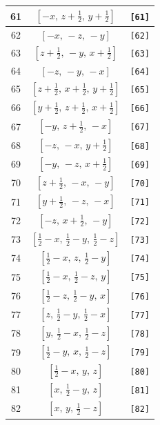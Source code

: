 \documentclass[fleqn,8pt]{jsarticle}
\begin{document}
\begin{longtable}{ccc}
61 & $\left[ - x,\, z + \frac{1}{2},\, y + \frac{1}{2} \right]$ & {\tt [61]} \\ \hline
62 & $\left[ - x,\, - z,\, - y \right]$ & {\tt [62]} \\ \hline
63 & $\left[ z + \frac{1}{2},\, - y,\, x + \frac{1}{2} \right]$ & {\tt [63]} \\ \hline
64 & $\left[ - z,\, - y,\, - x \right]$ & {\tt [64]} \\ \hline
65 & $\left[ z + \frac{1}{2},\, x + \frac{1}{2},\, y + \frac{1}{2} \right]$ & {\tt [65]} \\ \hline
66 & $\left[ y + \frac{1}{2},\, z + \frac{1}{2},\, x + \frac{1}{2} \right]$ & {\tt [66]} \\ \hline
67 & $\left[ - y,\, z + \frac{1}{2},\, - x \right]$ & {\tt [67]} \\ \hline
68 & $\left[ - z,\, - x,\, y + \frac{1}{2} \right]$ & {\tt [68]} \\ \hline
69 & $\left[ - y,\, - z,\, x + \frac{1}{2} \right]$ & {\tt [69]} \\ \hline
70 & $\left[ z + \frac{1}{2},\, - x,\, - y \right]$ & {\tt [70]} \\ \hline
71 & $\left[ y + \frac{1}{2},\, - z,\, - x \right]$ & {\tt [71]} \\ \hline
72 & $\left[ - z,\, x + \frac{1}{2},\, - y \right]$ & {\tt [72]} \\ \hline
73 & $\left[ \frac{1}{2} - x,\, \frac{1}{2} - y,\, \frac{1}{2} - z \right]$ & {\tt [73]} \\ \hline
74 & $\left[ \frac{1}{2} - x,\, z,\, \frac{1}{2} - y \right]$ & {\tt [74]} \\ \hline
75 & $\left[ \frac{1}{2} - x,\, \frac{1}{2} - z,\, y \right]$ & {\tt [75]} \\ \hline
76 & $\left[ \frac{1}{2} - z,\, \frac{1}{2} - y,\, x \right]$ & {\tt [76]} \\ \hline
77 & $\left[ z,\, \frac{1}{2} - y,\, \frac{1}{2} - x \right]$ & {\tt [77]} \\ \hline
78 & $\left[ y,\, \frac{1}{2} - x,\, \frac{1}{2} - z \right]$ & {\tt [78]} \\ \hline
79 & $\left[ \frac{1}{2} - y,\, x,\, \frac{1}{2} - z \right]$ & {\tt [79]} \\ \hline
80 & $\left[ \frac{1}{2} - x,\, y,\, z \right]$ & {\tt [80]} \\ \hline
81 & $\left[ x,\, \frac{1}{2} - y,\, z \right]$ & {\tt [81]} \\ \hline
82 & $\left[ x,\, y,\, \frac{1}{2} - z \right]$ & {\tt [82]} \\ \hline

\end{longtable}
\end{document}
